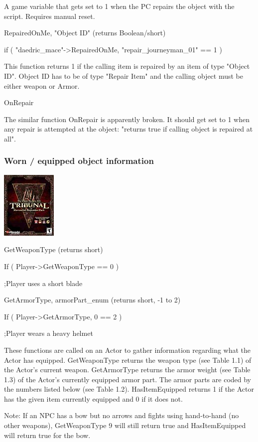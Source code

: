 \documentclass[
]{article}
\begin{document}
A game variable that gets set to 1 when the PC repairs the object with
the script. Requires manual reset.

RepairedOnMe, "Object ID" (returns Boolean/short)

if ( "daedric\_mace"-\textgreater RepairedOnMe, "repair\_journeyman\_01"
== 1 )

This function returns 1 if the calling item is repaired by an item of
type "Object ID". Object ID has to be of type "Repair Item" and the
calling object must be either weapon or Armor.

OnRepair

The similar function OnRepair is apparently broken. It should get set to
1 when any repair is attempted at the object: "returns true if calling
object is repaired at all".

\hypertarget{worn-equipped-object-information}{%
\subsubsection{Worn / equipped object
information}\label{worn-equipped-object-information}}

\includegraphics{media/image6.png}

GetWeaponType (returns short)

If ( Player-\textgreater GetWeaponType == 0 )

;Player uses a short blade

GetArmorType, armorPart\_enum (returns short, -1 to 2)

If ( Player-\textgreater GetArmorType, 0 == 2 )

;Player wears a heavy helmet

These functions are called on an Actor to gather information regarding
what the Actor has equipped. GetWeaponType returns the weapon type (see
Table 1.1) of the Actor's current weapon. GetArmorType returns the armor
weight (see Table 1.3) of the Actor's currently equipped armor part. The
armor parts are coded by the numbers listed below (see Table 1.2).
HasItemEquipped returns 1 if the Actor has the given item currently
equipped and 0 if it does not.

Note: If an NPC has a bow but no arrows and fights using hand-to-hand
(no other weapons), GetWeaponType 9 will still return true and
HasItemEquipped will return true for the bow.
\end{document}
